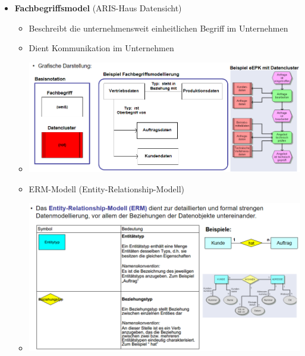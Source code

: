 \documentclass[11pt,a4paper]{article}
\begin{document}
\begin{itemize}
	\pagebreak
	
	\item \textbf{Fachbegriffsmodel} (ARIS-Haus Datensicht)
		\begin{itemize}
		\item Beschreibt die unternehmensweit einheitlichen Begriff im Unternehmen
		\item Dient Kommunikation im Unternehmen
		\item[] \includegraphics[width=15cm]{Bilder/fachbegriffsmodell}
		\item ERM-Modell (Entity-Relationship-Modell)
		\item[] \includegraphics[width=15cm]{Bilder/erm}
		\end{itemize}
\end{itemize}
\end{document}
